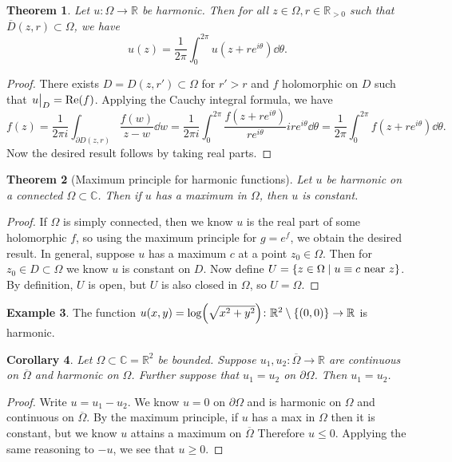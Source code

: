 \documentclass[leqno, openany]{memoir}
\newtheorem{thm}{Theorem}[section]
\newtheorem{cor}[thm]{Corollary}
\theoremstyle{definition}
\newtheorem{exm}[thm]{Example}
\theoremstyle{remark}
\theoremstyle{plain}
\theoremstyle{definition}
\theoremstyle{remark}
\newcommand{\R}{\mathbb{R}}
\newcommand{\C}{\mathbb{C}}
\newcommand{\ol}[1]{\overline{#1}}
\begin{document}
\begin{thm} Let $u \colon \Omega \to \R$ be harmonic. Then for all $z \in
    \Omega, r \in \R_{>0}$ such that $\ol{D}(z,r) \subset \Omega$, we have \[
    u(z) = \frac{1}{2 \pi} \int_0^{2 \pi} u(z + re^{i\theta}) \dd{\theta}. \]
\end{thm}

\begin{proof} There exists $D = D(z, r') \subset \Omega$ for $r' > r$ and $f$
    holomorphic on $D$ such that $\eval{u}_D = \Re(f)$. Applying the Cauchy
    integral formula, we have \[ f(z) = \frac{1}{2 \pi i} \int_{\partial D(z,
    r)} \frac{f(w)}{z-w} \dd{w} = \frac{1}{2 \pi i} \int_0^{2 \pi} \frac{f(z+
    re^{i\theta})}{re^{i\theta}} ire^{i\theta} \dd{\theta} = \frac{1}{2\pi}
\int_0^{2\pi} f(z+re^{i\theta}) \dd{\theta}. \] Now the desired result follows
by taking real parts.  \end{proof}

\begin{thm}[Maximum principle for harmonic functions] Let $u$ be harmonic on a
connected $\Omega \subset \C$. Then if $u$ has a maximum in $\Omega$, then $u$
is constant.  \end{thm}

\begin{proof} If $\Omega$ is simply connected, then we know $u$ is the real
    part of some holomorphic $f$, so using the maximum principle for $g = e^f$,
    we obtain the desired result. In general, suppose $u$ has a maximum $c$ at
    a point $z_0 \in \Omega$. Then for $z_0 \in D \subset \Omega$ we know $u$
    is constant on $D$. Now define $U = \qty{z \in \Omega \mid u \equiv c
    \text{ near }z}$. By definition, $U$ is open, but $U$ is also closed in
    $\Omega$, so $U = \Omega$.  \end{proof}

\begin{exm} The function $u(x,y) = \log(\sqrt{x^2 + y^2}) \colon \R^2 \setminus
\qty{(0,0)} \to \R$ is harmonic.  \end{exm}

\begin{cor} Let $\Omega \subset \C = \R^2$ be bounded. Suppose $u_1, u_2 \colon
\ol{\Omega} \to \R$ are continuous on $\ol{\Omega}$ and harmonic on $\Omega$.
Further suppose that $u_1 = u_2$ on $\partial \Omega$. Then $u_1 = u_2$.
\end{cor}

\begin{proof} Write $u = u_1 - u_2$. We know $u = 0$ on $\partial \Omega$ and
    is harmonic on $\Omega$ and continuous on $\ol{\Omega}$. By the maximum
    principle, if $u$ has a max in $\Omega$ then it is constant, but we know
    $u$ attains a maximum on $\ol{\Omega}$ Therefore $u \leq 0$. Applying the
    same reasoning to $-u$, we see that $u \geq 0$.  \end{proof}
\end{document}
